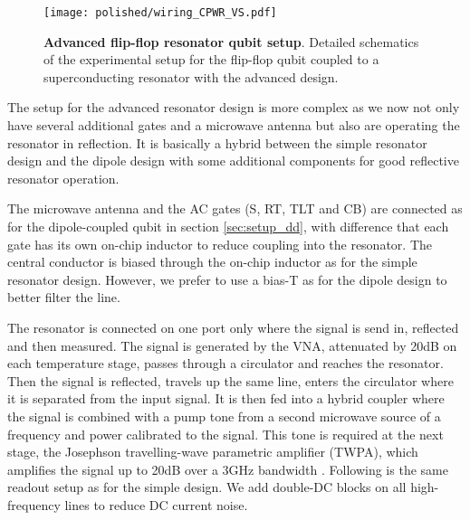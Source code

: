 \begin{figure}
	\centering
	\texttt{[image: polished/wiring\_CPWR\_VS.pdf]}
	\caption[Advanced flip-flop resonator qubit setup]{\textbf{Advanced flip-flop resonator qubit setup}. Detailed schematics of the experimental setup for the flip-flop qubit coupled to a superconducting resonator with the advanced design.  }
	\label{fig:resonator_setup_new}
\end{figure}

The setup for the advanced resonator design is more complex as we now not only have several additional gates and a microwave antenna but also are operating the resonator in reflection. It is basically a hybrid between the simple resonator design and the dipole design with some additional components for good reflective resonator operation.

The microwave antenna and the AC gates (S, RT, TLT and CB) are connected as for the dipole-coupled qubit in section \ref{sec:setup_dd}, with difference that each gate has its own on-chip inductor to reduce coupling into the resonator.  
The central conductor is biased through the on-chip inductor as for the simple resonator design. However, we prefer to use a bias-T as for the dipole design to better filter the line. 

The resonator is connected on one port only where the signal is send in, reflected and then measured. 
The signal is generated by the VNA, attenuated by 20dB on each temperature stage, passes through a circulator and reaches the resonator. Then the signal is reflected, travels up the same line, enters the circulator where it is separated from the input signal. It is then fed into a hybrid coupler where the signal is combined with a pump tone from a second microwave source of a frequency and power calibrated to the signal. This tone is required at the next stage, the Josephson travelling-wave parametric amplifier (TWPA), which amplifies the signal up to 20dB over a 3GHz bandwidth \cite{Macklin2015}. Following is the same readout setup as for the simple design. We add double-DC blocks on all high-frequency lines to reduce DC current noise. 




